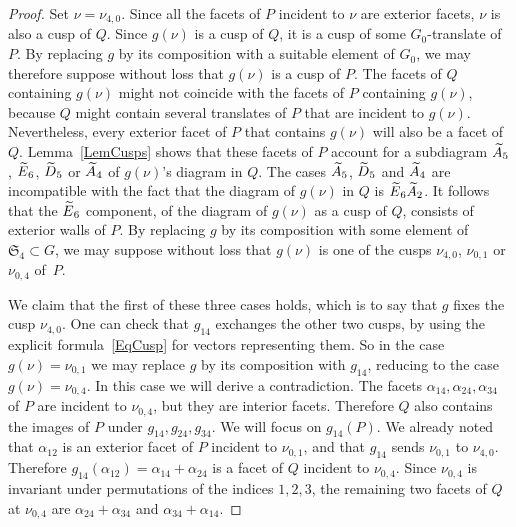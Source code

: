 \documentclass[11pt]{article}
\theoremstyle{definition}
\numberwithin{equation}{section}
\numberwithin{figure}{section}
\numberwithin{table}{section}
\let\oldtilde\tilde
\renewcommand*\tilde[1]{\mathchoice{\widetilde{#1}}{\widetilde{#1}}{\oldtilde{#1}}{\oldtilde{#1}}}
\newcommand*\Atilde{\tilde A}
\newcommand*\Dtilde{\tilde D}
\newcommand*\Etilde{\tilde E}
\newcommand*\sset{\subset}
\newcommand{\frakS}{\mathfrak{S}}
\begin{document}
\begin{proof}
Set $\nu=\nu_{4,0}$. Since all the facets of $P$ incident to $\nu$ are exterior facets, $\nu$ is also a cusp of $Q$. Since $g(\nu)$ is a cusp of $Q$, it is a cusp of some $G_0$-translate of $P$. By replacing $g$ by its composition with a suitable element of $G_0$, we may therefore suppose without loss that $g(\nu)$ is a cusp of $P$. The facets of $Q$ containing $g(\nu)$ might not coincide with the facets of $P$ containing $g(\nu)$, because $Q$ might contain several translates of $P$ that are incident to $g(\nu)$. Nevertheless, every exterior facet of $P$ that contains $g(\nu)$ will also be a facet of $Q$. Lemma~\ref{LemCusps} shows that these facets of $P$ account for a subdiagram $\Atilde_5$, $\Etilde_6$, $\Dtilde_5$ or $\Atilde_4$ of $g(\nu)$'s diagram in $Q$. The cases $\Atilde_5$, $\Dtilde_5$ and $\Atilde_4$ are incompatible with the fact that the diagram of $g(\nu)$ in $Q$ is $\Etilde_6\Atilde_2$. It follows that the $\Etilde_6$ component, of the diagram of $g(\nu)$ as a cusp of $Q$, consists of exterior walls of $P$. By replacing $g$ by its composition with some element of $\frakS_4\sset G$, we may suppose without loss that $g(\nu)$ is one of the cusps $\nu_{4,0}$, $\nu_{0,1}$ or $\nu_{0,4}$ of~$P$.

We claim that the first of these three cases holds, which is to say that $g$ fixes the cusp $\nu_{4,0}$. One can check that $g_{14}$ exchanges the other two cusps, by using the explicit formula~\eqref{EqCusp} for vectors representing them. So in the case $g(\nu)=\nu_{0,1}$ we may replace $g$ by its composition with $g_{14}$, reducing to the case $g(\nu)=\nu_{0,4}$. In this case we will derive a contradiction. The facets $\alpha_{14},\alpha_{24},\alpha_{34}$ of $P$ are incident to $\nu_{0,4}$, but they are interior facets. Therefore $Q$ also contains the images of $P$ under $g_{14},g_{24},g_{34}$. We will focus on $g_{14}(P)$. We already noted that $\alpha_{12}$ is an exterior facet of $P$ incident to $\nu_{0,1}$, and that $g_{14}$ sends $\nu_{0,1}$ to $\nu_{4,0}$. Therefore $g_{14}(\alpha_{12})=\alpha_{14}+\alpha_{24}$ is a facet of $Q$ incident to $\nu_{0,4}$. Since $\nu_{0,4}$ is invariant under permutations of the indices $1,2,3$, the remaining two facets of $Q$ at $\nu_{0,4}$ are $\alpha_{24}+\alpha_{34}$ and $\alpha_{34}+\alpha_{14}$.


\end{proof}
\end{document}
